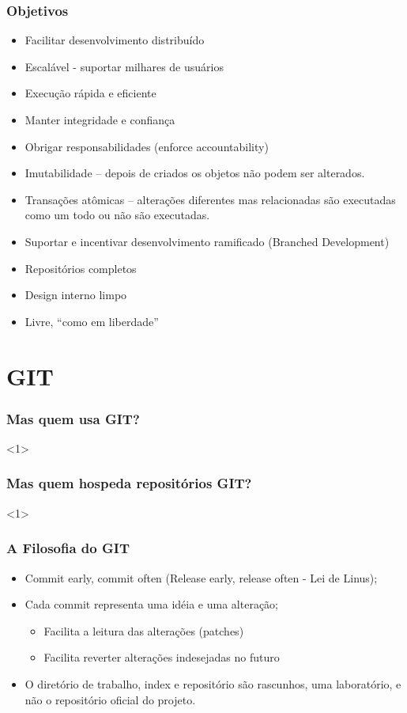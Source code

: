 \documentclass{beamer}
\begin{document}
\begin{frame}
\frametitle{Objetivos}

\begin{itemize}
\item Facilitar desenvolvimento distribuído
\item Escalável - suportar milhares de usuários
\item Execução rápida e eficiente
\item Manter integridade e confiança
\item Obrigar responsabilidades (enforce accountability)
\item Imutabilidade – depois de criados os objetos não podem ser alterados.
\item Transações atômicas – alterações diferentes mas relacionadas são executadas como um todo ou não são executadas.
\item Suportar e incentivar desenvolvimento ramificado (Branched Development)
\item Repositórios completos
\item Design interno limpo
\item Livre, “como em liberdade”
\end{itemize}

\end{frame}

\section{GIT}
\begin{frame}
\frametitle{Mas quem usa GIT?}

<1>

\end{frame}

\begin{frame}
\frametitle{Mas quem hospeda repositórios GIT?}

<1>

\end{frame}

\begin{frame}
\frametitle{A Filosofia do GIT}
\begin{itemize}
\item Commit early, commit often (Release early, release often - Lei de Linus);
\item Cada commit representa uma idéia e uma alteração;
\begin{itemize}
\item Facilita a leitura das alterações (patches)
\item Facilita reverter alterações indesejadas no futuro
\end{itemize}
\item O diretório de trabalho, index e repositório são rascunhos, uma laboratório, e não o repositório oficial do projeto.
\end{itemize}
\end{frame}
\end{document}
